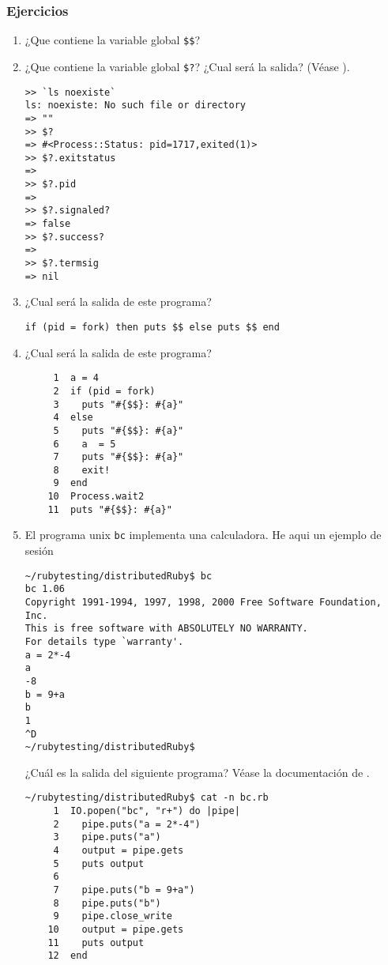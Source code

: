 \subsubsection{Ejercicios}
\label{ejercicios:procesos}
\begin{enumerate}
\item ¿Que contiene la variable global \verb|$$|?
\item ¿Que contiene la variable global \verb|$?|?
 ¿Cual será la salida?
(Véase ).
\begin{verbatim}
>> `ls noexiste`
ls: noexiste: No such file or directory
=> ""
>> $?
=> #<Process::Status: pid=1717,exited(1)>
>> $?.exitstatus
=> 
>> $?.pid
=> 
>> $?.signaled?
=> false
>> $?.success?
=> 
>> $?.termsig
=> nil
\end{verbatim}
\item ¿Cual será la salida de este programa?
\begin{verbatim}
if (pid = fork) then puts $$ else puts $$ end
\end{verbatim}
\item ¿Cual será la salida de este programa?
\begin{verbatim}
     1  a = 4
     2  if (pid = fork)
     3    puts "#{$$}: #{a}"
     4  else 
     5    puts "#{$$}: #{a}"
     6    a  = 5
     7    puts "#{$$}: #{a}"
     8    exit!
     9  end
    10  Process.wait2
    11  puts "#{$$}: #{a}"
\end{verbatim}
\item
El programa unix \verb|bc| implementa una calculadora. He aqui un ejemplo de sesión
\begin{verbatim}
~/rubytesting/distributedRuby$ bc
bc 1.06
Copyright 1991-1994, 1997, 1998, 2000 Free Software Foundation, Inc.
This is free software with ABSOLUTELY NO WARRANTY.
For details type `warranty'. 
a = 2*-4
a
-8      
b = 9+a
b
1
^D
~/rubytesting/distributedRuby$
\end{verbatim}
¿Cuál es la salida del siguiente programa?
Véase la documentación de .
\begin{verbatim}
~/rubytesting/distributedRuby$ cat -n bc.rb 
     1  IO.popen("bc", "r+") do |pipe|
     2    pipe.puts("a = 2*-4")
     3    pipe.puts("a")
     4    output = pipe.gets
     5    puts output
     6  
     7    pipe.puts("b = 9+a")
     8    pipe.puts("b")
     9    pipe.close_write  
    10    output = pipe.gets
    11    puts output
    12  end
\end{verbatim}
\end{enumerate}


